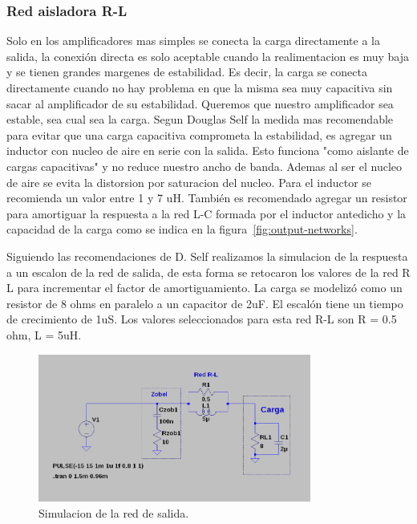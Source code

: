 \documentclass[a4paper,12pt,twoside]{article}
\begin{document}
\subsubsection{Red aisladora R-L}

Solo en los amplificadores mas simples se conecta la carga directamente a la salida, la conexión directa es solo aceptable 
cuando la realimentacion es muy baja y se tienen grandes margenes de estabilidad.
Es decir, la carga se conecta directamente cuando no hay problema en que la misma sea muy capacitiva sin sacar al
amplificador de su estabilidad.
Queremos que nuestro amplificador sea estable, sea cual sea la carga.
Segun Douglas Self la medida mas recomendable para evitar que una carga capacitiva comprometa la estabilidad, es agregar un inductor con nucleo
de aire en serie con la salida. Esto funciona "como aislante de cargas capacitivas" y no reduce nuestro ancho de banda. Ademas al ser el nucleo de
aire se evita la distorsion por saturacion del nucleo.
Para el inductor se recomienda un valor entre 1 y 7 uH.
También es recomendado agregar un resistor para amortiguar la respuesta a la red L-C formada por el inductor antedicho y la capacidad de la carga como se indica en la figura~\ref{fig:output-networks}.

Siguiendo las recomendaciones de D. Self realizamos la simulacion de la respuesta a un escalon de la red de salida, de esta forma se retocaron los 
valores de la red R L para incrementar el factor de amortiguamiento. 
La carga se modelizó como un resistor de 8 ohms en paralelo a un capacitor de 2uF. El escalón tiene un tiempo de crecimiento de 1uS.
Los valores seleccionados para esta red  R-L son R = 0.5 ohm, L = 5uH.

\begin{figure}[H]
\centering
\includegraphics[width=0.8\textwidth]{img/simulacion_zobel}
\caption{Simulacion de la red de salida.}
\label{fig:sim_red_salidas} 
\end{figure}
\end{document}
